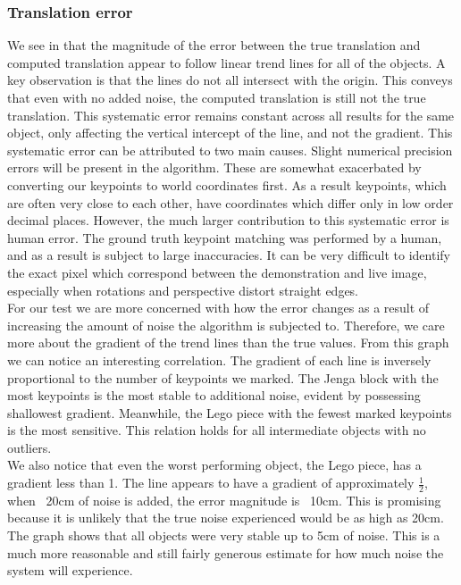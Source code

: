 \subsubsection{Translation error}
We see in  that the magnitude of the error between the true translation and computed translation appear to follow linear trend lines for all of the objects. A key observation is that the lines do not all intersect with the origin. This conveys that even with no added noise, the computed translation is still not the true translation. This systematic error remains constant across all results for the same object, only affecting the vertical intercept of the line, and not the gradient. This systematic error can be attributed to two main causes. Slight numerical precision errors will be present in the algorithm. These are somewhat exacerbated by converting our keypoints to world coordinates first. As a result keypoints, which are often very close to each other, have coordinates which differ only in low order decimal places. However, the much larger contribution to this systematic error is human error. The ground truth keypoint matching was performed by a human, and as a result is subject to large inaccuracies. It can be very difficult to identify the exact pixel which correspond between the demonstration and live image, especially when rotations and perspective distort straight edges.\\

For our test we are more concerned with how the error changes as a result of increasing the amount of noise the algorithm is subjected to. Therefore, we care more about the gradient of the trend lines than the true values. From this graph we can notice an interesting correlation. The gradient of each line is inversely proportional to the number of keypoints we marked. The Jenga block with the most keypoints is the most stable to additional noise, evident by possessing shallowest gradient. Meanwhile, the Lego piece with the fewest marked keypoints is the most sensitive. This relation holds for all intermediate objects with no outliers.\\

We also notice that even the worst performing object, the Lego piece, has a gradient less than 1. The line appears to have a gradient of approximately $\frac{1}{2}$, when ~20cm of noise is added, the error magnitude is ~10cm. This is promising because it is unlikely that the true noise experienced would be as high as 20cm. The graph shows that all objects were very stable up to 5cm of noise. This is a much more reasonable and still fairly generous estimate for how much noise the system will experience.\\

